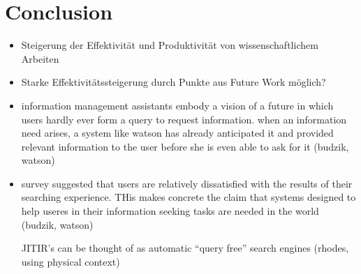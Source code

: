  \section{Conclusion}
 \begin{itemize}
 		\item Steigerung der Effektivität und Produktivität von wissenschaftlichem Arbeiten
 		\item Starke Effektivitätssteigerung durch Punkte aus Future Work möglich?
 		\item information management assistants embody a vision of a future in which users hardly ever form a query to request information. when an information need arises, a system like watson has already anticipated it and provided relevant information to the user before she is even able to ask for it (budzik, watson)
 		\item survey suggested that users are relatively dissatisfied with the results of their searching experience. THis makes concrete the claim that systems designed to help useres in their information seeking tasks are needed in the world (budzik, watson)

 		JITIR's can be thought of as automatic ``query free'' search engines (rhodes, using physical context)
 	\end{itemize}